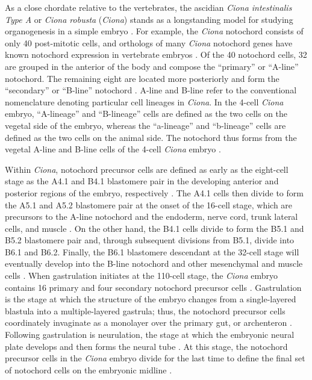 \begin{dissertationintroduction}
    As a close chordate relative to the vertebrates, the ascidian \textit{Ciona intestinalis Type A} or \textit{Ciona robusta} (\textit{Ciona}) stands as a longstanding model for studying organogenesis in a simple embryo \cite{dehal2002, delsuc2006, imai2006, satoh2014, satou2019, winkley2020}. For example, the \textit{Ciona} notochord consists of only 40 post-mitotic cells, and orthologs of many \textit{Ciona} notochord genes have known notochord expression in vertebrate embryos \cite{reeves2017, satoh2014, winkley2020}. Of the 40 notochord cells, 32 are grouped in the anterior of the body and compose the “primary” or “A-line” notochord. The remaining eight are located more posteriorly and form the “secondary” or “B-line” notochord \cite{satoh2014, winkley2020}. A-line and B-line refer to the conventional nomenclature denoting particular cell lineages in \textit{Ciona}. In the 4-cell \textit{Ciona} embryo, “A-lineage” and “B-lineage” cells are defined as the two cells on the vegetal side of the embryo, whereas the “a-lineage” and “b-lineage” cells are defined as the two cells on the animal side. The notochord thus forms from the vegetal A-line and B-line cells of the 4-cell \textit{Ciona} embryo \cite{satoh2014}.

    Within \textit{Ciona}, notochord precursor cells are defined as early as the eight-cell stage as the A4.1 and B4.1 blastomere pair in the developing anterior and posterior regions of the embryo, respectively \cite{corbo1997, satoh2014, yagi2004}. The A4.1 cells then divide to form the A5.1 and A5.2 blastomere pair at the onset of the 16-cell stage, which are precursors to the A-line notochord and the endoderm, nerve cord, trunk lateral cells, and muscle \cite{satoh2014}. On the other hand, the B4.1 cells divide to form the B5.1 and B5.2 blastomere pair and, through subsequent divisions from B5.1, divide into B6.1 and B6.2. Finally, the B6.1 blastomere descendant at the 32-cell stage will eventually develop into the B-line notochord and other mesenchymal and muscle cells \cite{corbo1997, satoh2014, yagi2004}. When gastrulation initiates at the 110-cell stage, the \textit{Ciona} embryo contains 16 primary and four secondary notochord precursor cells \cite{satoh2014}. Gastrulation is the stage at which the structure of the embryo changes from a single-layered blastula into a multiple-layered gastrula; thus, the notochord precursor cells coordinately invaginate as a monolayer over the primary gut, or archenteron \cite{rhee2005, winkley2020}. Following gastrulation is neurulation, the stage at which the embryonic neural plate develops and then forms the neural tube \cite{rhee2005, satoh2014}. At this stage, the notochord precursor cells in the \textit{Ciona} embryo divide for the last time to define the final set of notochord cells on the embryonic midline \cite{nakamura2012}. 


\end{dissertationintroduction}
